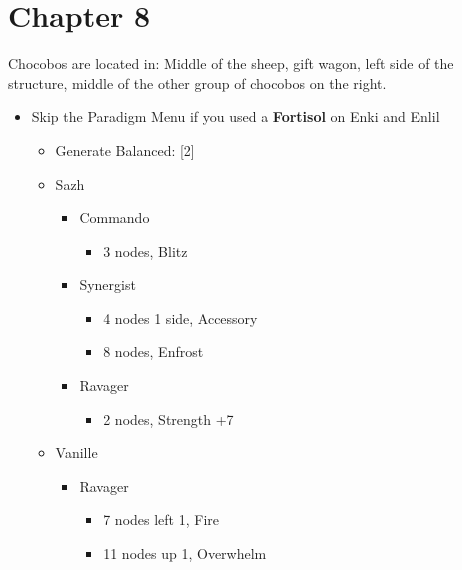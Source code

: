 \chapter{Chapter 8}

	Chocobos are located in: Middle of the sheep, gift wagon, left side of the structure, middle of the other group of chocobos on the right.
	\begin{menu}
		\begin{itemize}
			\item Skip the Paradigm Menu if you used a \textbf{Fortisol} on Enki and Enlil
			      \paradigm
			      \begin{itemize}
			      		\item Generate Balanced: [2]
			      \end{itemize}
			      \crystarium
			      \begin{itemize}
				      \item Sazh
				            \begin{itemize}
					            \item Commando
					                  \begin{itemize}
						                  \item 3 nodes, Blitz
					                  \end{itemize}
					            \item Synergist
					                  \begin{itemize}
						                  \item 4 nodes 1 side, Accessory
						                  \item 8 nodes, Enfrost
					                  \end{itemize}
					            \item Ravager
					                  \begin{itemize}
						                  \item 2 nodes, Strength +7
					                  \end{itemize}
				            \end{itemize}
				      \item Vanille
				            \begin{itemize}
					            \item Ravager
					                  \begin{itemize}
						                  \item 7 nodes left 1, Fire
						                  \item 11 nodes up 1, Overwhelm

\end{itemize}
\end{itemize}
\end{itemize}
\end{itemize}
\end{menu}
